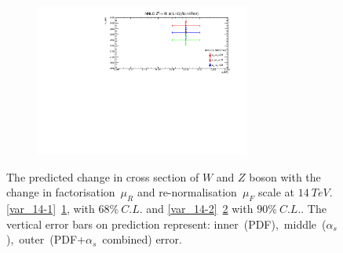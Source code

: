 \begin{figure}[H]
\begin{subfigure}{0.8\textwidth}
\vspace*{-8mm}
\caption{}
\label{var_14-3}
\end{subfigure}
\begin{subfigure}{0.8\textwidth}
\includegraphics[height=5cm, width=\textwidth]{chapter4/CompZ14_90.pdf}
\vspace*{-8mm}
\caption{}
\label{var_14-4}
\end{subfigure}
\caption{The predicted change in cross section of $W$ and $Z$ boson with the change in factorisation~$\mu_{R}$ and re-normalisation~$\mu_{F}$ scale at $14~TeV$. \ref{var_14-1}~\ref{var_14-3}, with $68\%~C.L.$ and \ref{var_14-2}~\ref{var_14-4} with $90\%~C.L.$. The vertical error bars on prediction represent: inner~(PDF),~middle~($\alpha_{s}$),~outer~(PDF+$\alpha_{s}$~combined) error.}
\label{comp2} 
\end{figure}



